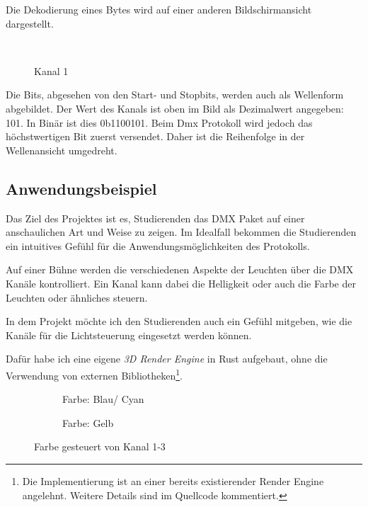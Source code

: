 Die Dekodierung eines Bytes wird auf einer anderen Bildschirmansicht dargestellt.

\begin{figure}[H]
	\centering
	\\
	\caption{Kanal 1}
\end{figure}

Die Bits, abgesehen von den Start- und Stopbits, werden auch als Wellenform abgebildet. Der Wert des Kanals ist oben im Bild als Dezimalwert angegeben: 101. In Binär ist dies 0b1100101. Beim Dmx Protokoll wird jedoch das höchstwertigen Bit zuerst versendet. Daher ist die Reihenfolge in der Wellenansicht umgedreht.

\subsection{Anwendungsbeispiel}

Das Ziel des Projektes ist es, Studierenden das DMX Paket auf einer anschaulichen Art und Weise zu zeigen. Im Idealfall bekommen die Studierenden ein intuitives Gefühl für die Anwendungsmöglichkeiten des Protokolls.

Auf einer Bühne werden die verschiedenen Aspekte der Leuchten über die DMX Kanäle kontrolliert. Ein Kanal kann dabei die Helligkeit oder auch die Farbe der Leuchten oder ähnliches steuern.

In dem Projekt möchte ich den Studierenden auch ein Gefühl mitgeben, wie die Kanäle für die Lichtsteuerung eingesetzt werden können.

Dafür habe ich eine eigene \emph{3D Render Engine} in Rust aufgebaut, ohne die Verwendung von externen Bibliotheken\footnote{Die Implementierung ist an einer bereits existierender Render Engine angelehnt. Weitere Details sind im Quellcode kommentiert.}.

\begin{figure}[H]
	\centering
	\begin{subfigure}{.5\textwidth}
		\centering
		\caption{Farbe: Blau/ Cyan}
		\label{fig:renderSpaceshipCyan}
	\end{subfigure}%
	\begin{subfigure}{.5\textwidth}
		\centering
		\caption{Farbe: Gelb}
		\label{fig:renderSpaceshipYellow}
	\end{subfigure}
	\caption{Farbe gesteuert von Kanal 1-3}
	\label{fig:spaceship_renderes}
\end{figure}

